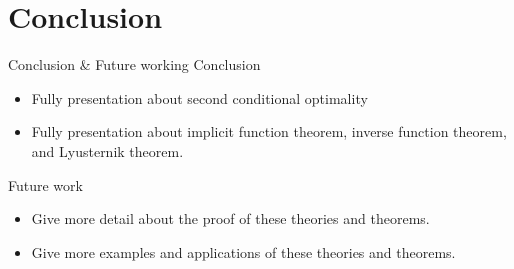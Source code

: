 \section{Conclusion}

\begin{frame}{Conclusion \& Future working}
    Conclusion
    \begin{itemize}
        \item Fully presentation about second conditional optimality
        \item Fully presentation about implicit function theorem, inverse function theorem, and Lyusternik theorem.
    \end{itemize}
    Future work
    \begin{itemize}
        \item Give more detail about the proof of these theories and theorems.
        \item Give more examples and applications of these theories and theorems.
    \end{itemize}
\end{frame}